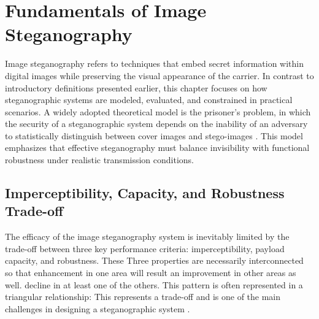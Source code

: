 \documentclass[12pt,a4paper,oneside]{report}
\begin{document}
	\section{Fundamentals of Image Steganography}
	Image steganography refers to techniques that embed secret information within digital images while preserving the visual appearance of the carrier. In contrast to introductory definitions presented earlier, this chapter focuses on how steganographic systems are modeled, evaluated, and constrained in practical scenarios. A widely adopted theoretical model is the prisoner's problem, in which the security of a steganographic system depends on the inability of an adversary to statistically distinguish between cover images and stego-images \cite{morkel2005overview}. This model emphasizes that effective steganography must balance invisibility with functional robustness under realistic transmission conditions.
	
	\subsection{Imperceptibility, Capacity, and Robustness Trade-off}
	
	The efficacy of the image steganography system is inevitably limited by the trade-off between three key performance criteria: imperceptibility, payload capacity, and robustness. These
	Three properties are necessarily interconnected so that enhancement in one area will result an improvement in other areas as well.
	decline in at least one of the others. This pattern is often represented in a triangular relationship:
	This represents a trade-off and is one of the main challenges in designing a steganographic system \cite{Fridrich2012}.
	
\end{document}
